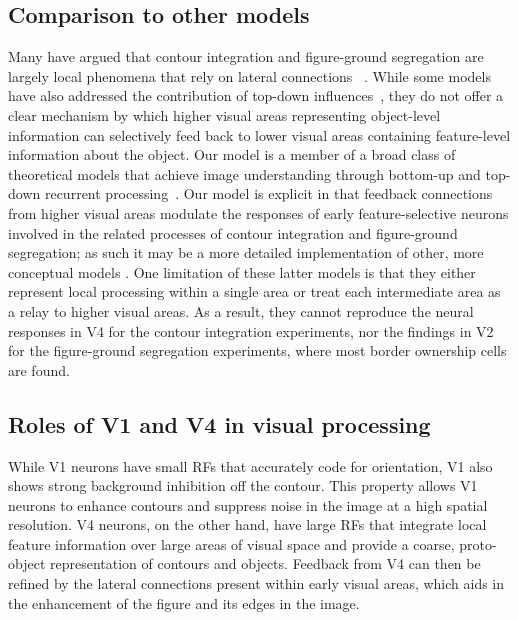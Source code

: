 \subsection{Comparison to other models}
Many have argued that contour integration and figure-ground segregation
are largely local phenomena that rely on lateral connections ~\citep{Grossberg94, Grossberg97, Li98, Zhaoping05, Piech_etal13}. While some models have also addressed the contribution of top-down influences~\citep{Li98,Piech_etal13}, they do not offer a clear mechanism by which higher visual areas representing object-level information can selectively feed back to lower visual areas containing feature-level information about the object. Our model is a member of a broad class of theoretical models that achieve image understanding through bottom-up and top-down recurrent processing~\citep{Ullman84,Hochstein_Ahissar02,Roelfsema_06,Epshtein_etal08}. Our model is explicit in that feedback connections from higher visual areas modulate the responses of early feature-selective neurons involved in the related processes of contour integration and figure-ground segregation; as such it may be a more detailed implementation of other, more conceptual models \citep{Piech_etal13,Poort_etal12}. One limitation of these latter models is that they either represent local processing within a single area or treat each intermediate area as a relay to higher visual areas. As a result, they cannot reproduce the neural responses in V4 for the contour integration experiments, nor the findings in V2 for the figure-ground segregation experiments, where most border ownership cells are found.

\subsection{Roles of V1 and V4 in visual processing}
While V1 neurons have
small RFs that accurately code for orientation, V1 also shows strong
background inhibition off the contour. This property allows V1 neurons
to enhance contours and suppress noise in the image at a high spatial
resolution. V4 neurons, on the other hand, have large RFs that integrate
local feature information over large areas of visual space and provide
a coarse, proto-object representation of contours and objects.
Feedback from V4 can then be refined by the lateral connections present
within early visual areas, which aids in the enhancement of the figure
and its edges in the image.

